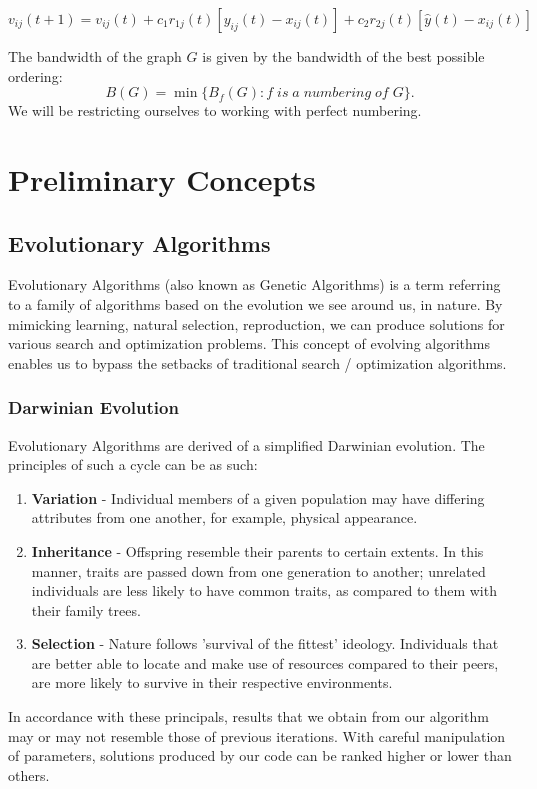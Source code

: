 \documentclass[conference,compsoc]{IEEEtran}
\begin{document}
\begin{equation}
  v_{ij}(t+1) = v_{ij}(t) + c_1r_{1j}(t)[y_{ij}(t)-x_{ij}(t)] + c_2r_{2j}(t)[\hat{y}(t) - x_{ij}(t)]
\end{equation}

The bandwidth of the graph $G$ is given by the bandwidth of the best possible ordering:
\begin{equation}
B(G) = \min\{B_f(G): f\; is\; a \;numbering\; of\; G\}.    
\end{equation}
We will be restricting ourselves to working with perfect numbering.

\section{Preliminary Concepts}
\subsection{Evolutionary Algorithms}
Evolutionary Algorithms (also known as Genetic Algorithms) is a term referring to a family of algorithms based on the evolution we see around us, in nature. By mimicking learning, natural selection, reproduction, we can produce solutions for various search and optimization problems. This concept of evolving algorithms enables us to bypass the setbacks of traditional search / optimization algorithms.

\subsubsection{Darwinian Evolution}
Evolutionary Algorithms are derived of a simplified Darwinian evolution. The principles of such a cycle can be as such:
\begin{enumerate}
    \item \textbf{Variation} - Individual members of a given population may have differing attributes from one another, for example, physical appearance.
    \item \textbf{Inheritance} - Offspring resemble their parents to certain extents. In this manner, traits are passed down from one generation to another; unrelated individuals are less likely to have common traits, as compared to them with their family trees.
    \item \textbf{Selection} - Nature follows 'survival of the fittest' ideology. Individuals that are better able to locate and make use of resources compared to their peers, are more likely to survive in their respective environments. 
\end{enumerate}
In accordance with these principals, results that we obtain from our algorithm may or may not resemble those of previous iterations. With careful manipulation of parameters, solutions produced by our code can be ranked higher or lower than others.
\end{document}
